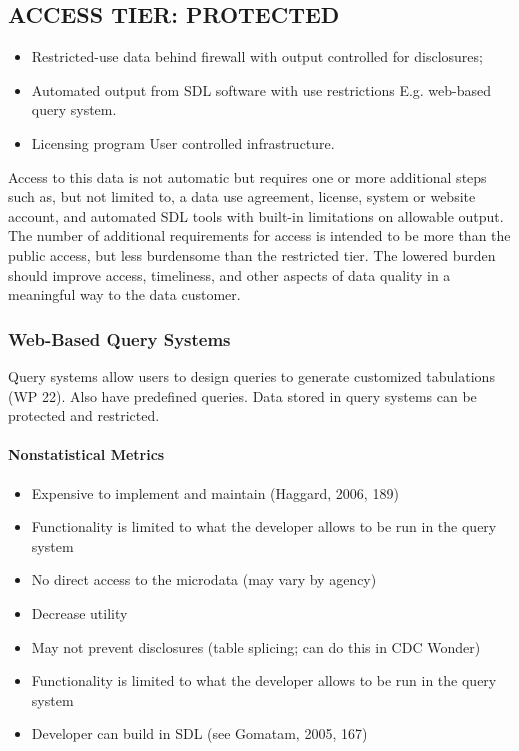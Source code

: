 

\subsection{ACCESS TIER: PROTECTED}
\begin{itemize}
\item{Restricted-use data behind firewall with output controlled for disclosures};
\item{Automated output from SDL software with use restrictions} E.g. web-based query system.
\item{Licensing program} User controlled infrastructure.
\end{itemize}

Access to this data is not automatic but requires one or more additional steps such as, but not limited to, a data use agreement, license, system or website account, and automated SDL tools with built-in limitations on allowable output. The number of additional requirements for access is intended to be more than the public access, but less burdensome than the restricted tier. The lowered burden should improve access, timeliness, and other aspects of data quality in a meaningful way to the data customer.

\subsubsection{Web-Based Query Systems} 
Query systems allow users to design queries to generate customized tabulations (WP 22). Also have predefined queries.
Data stored in query systems can be protected and restricted.






\paragraph{Nonstatistical Metrics}
\begin{itemize}
    \item  Expensive to implement and maintain (Haggard, 2006, 189)
   \item Functionality is limited to what the developer allows to be run in the query system
   \item No direct access to the microdata (may vary by agency)
   \item Decrease utility
   \item May not prevent disclosures (table splicing; can do this in CDC Wonder) 
   \item Functionality is limited to what the developer allows to be run in the query system
   \item Developer can build in SDL (see Gomatam, 2005, 167)
\end{itemize}


